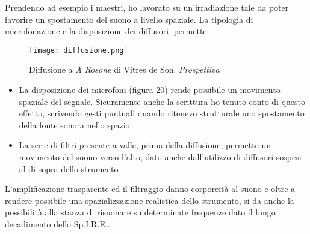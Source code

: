 Prendendo ad esempio i maestri, ho lavorato su un'irradiazione tale da poter favorire un spostamento del suono a livello spaziale. La tipologia di microfonazione e la disposizione dei diffusori, permette:

\begin{figure}[htbp]
\begin{center}
\texttt{[image: diffusione.png]}
\caption{Diffusione a \textit{A Rosone} di Vitres de Son. \textit{Prospettiva}}
\label{default}
\end{center}
\end{figure}

\begin{itemize}
\item{La disposizione dei microfoni (figura 20) rende possibile un movimento spaziale del segnale. Sicuramente anche la scrittura ho tenuto conto di questo effetto, scrivendo gesti puntuali quando ritenevo strutturale uno spostamento della fonte sonora nello spazio.}
\item{La serie di filtri presente a valle, prima della diffusione, permette un movimento del suono verso l'alto, dato anche dall'utilizzo di diffusori sospesi al di sopra dello strumento}
\end{itemize}

L'amplificazione trasparente ed il filtraggio danno corporeità al suono e oltre a rendere possibile una spazializzazione realistica dello strumento, si da anche la possibilità alla stanza di risuonare su determinate frequenze dato il lungo decadimento dello Sp.I.R.E..
